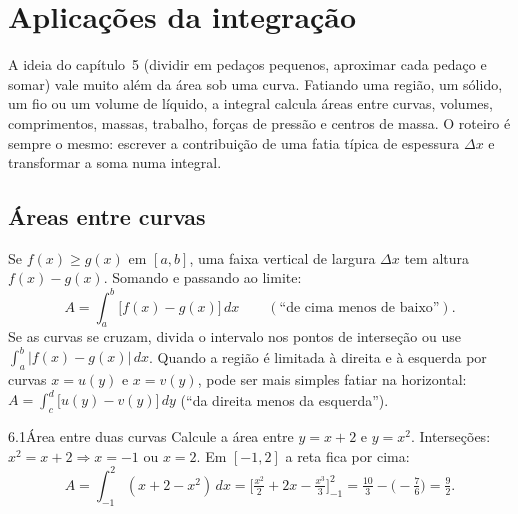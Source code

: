 \chapter{Aplicações da integração}

A ideia do capítulo~5 (dividir em pedaços pequenos, aproximar cada pedaço e somar) vale
muito além da área sob uma curva. Fatiando uma região, um sólido, um fio ou um volume de
líquido, a integral calcula áreas entre curvas, volumes, comprimentos, massas, trabalho,
forças de pressão e centros de massa. O roteiro é sempre o mesmo: escrever a contribuição
de uma fatia típica de espessura $\Delta x$ e transformar a soma numa integral.

\section{Áreas entre curvas}

Se $f(x)\ge g(x)$ em $[a,b]$, uma faixa vertical de largura $\Delta x$ tem altura
$f(x)-g(x)$. Somando e passando ao limite:
\[
A=\int_a^b\big[f(x)-g(x)\big]\,dx \qquad(\text{``de cima menos de baixo''}).
\]
Se as curvas se cruzam, divida o intervalo nos pontos de interseção ou use
$\int_a^b|f(x)-g(x)|\,dx$. Quando a região é limitada à direita e à esquerda por curvas
$x=u(y)$ e $x=v(y)$, pode ser mais simples fatiar na horizontal:
$A=\int_c^d\big[u(y)-v(y)\big]\,dy$ (``da direita menos da esquerda'').


\begin{exemplo}{6.1}{Área entre duas curvas}
Calcule a área entre $y=x+2$ e $y=x^2$.
\solucao
Interseções: $x^2=x+2\Rightarrow x=-1$ ou $x=2$. Em $[-1,2]$ a reta fica por cima:
\[
A=\int_{-1}^2(x+2-x^2)\,dx=\Big[\tfrac{x^2}2+2x-\tfrac{x^3}3\Big]_{-1}^2
=\tfrac{10}3-\big(-\tfrac76\big)=\tfrac92 .
\]
\end{exemplo}

